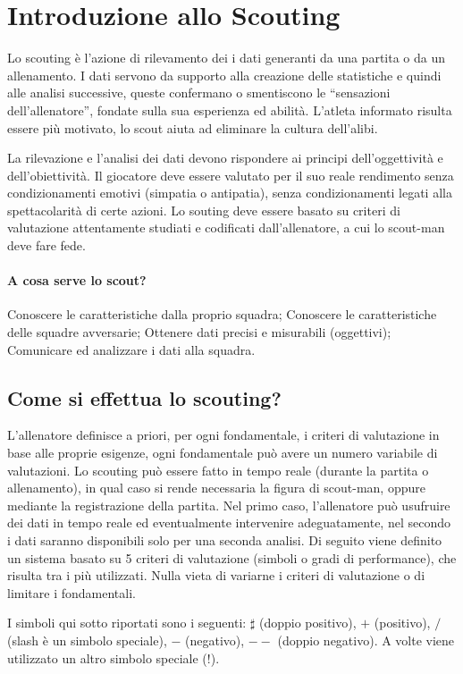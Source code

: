 \chapter{Introduzione allo Scouting}

Lo scouting è l'azione di rilevamento dei i dati generanti da una partita o da un allenamento.
I dati servono da supporto alla creazione delle statistiche e quindi alle analisi successive, queste confermano o smentiscono le “sensazioni dell’allenatore”, fondate sulla sua
esperienza ed abilità.
L’atleta informato risulta essere più motivato, lo scout aiuta ad eliminare la cultura dell’alibi.

La rilevazione e l'analisi dei dati devono rispondere ai principi dell'oggettività e dell'obiettività.
Il giocatore deve essere valutato per il suo reale rendimento senza condizionamenti emotivi (simpatia o antipatia), senza condizionamenti legati alla spettacolarità di certe azioni.
Lo souting deve essere basato su criteri di valutazione attentamente studiati e codificati dall'allenatore, a cui lo scout-man deve fare fede.

\subsubsection{A cosa serve lo scout?}
Conoscere le caratteristiche dalla proprio squadra;
Conoscere le caratteristiche delle squadre avversarie;
Ottenere dati precisi e misurabili (oggettivi);
Comunicare ed analizzare i dati alla squadra.

\section{Come si effettua lo scouting?}
L'allenatore definisce a priori, per ogni fondamentale, i criteri di valutazione in base alle proprie esigenze, ogni fondamentale può avere un numero variabile di valutazioni.
Lo scouting può essere fatto in tempo reale (durante la partita o allenamento), in qual caso si rende necessaria la figura di scout-man, oppure mediante la registrazione della partita.
Nel primo caso, l'allenatore può usufruire dei dati in tempo reale ed eventualmente intervenire adeguatamente, nel secondo i dati saranno disponibili solo per una seconda analisi.
Di seguito viene definito un sistema basato su 5 criteri di valutazione (simboli o gradi di performance), che risulta tra i più utilizzati. Nulla vieta di variarne i criteri di valutazione o di limitare i fondamentali.

I simboli qui sotto riportati sono i seguenti: $\sharp$ (doppio positivo), $+$ (positivo),
$/$ (slash è un simbolo speciale), $-$ (negativo), $--$ (doppio negativo). A volte viene utilizzato
un altro simbolo speciale ($!$).

